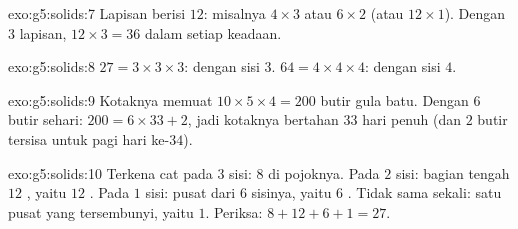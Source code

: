 \begin{solution}{exo:g5:solids:7}
Lapisan berisi $12$: misalnya $4 \times 3$ atau $6 \times 2$ (atau
$12 \times 1$). Dengan $3$ lapisan, 
$12 \times 3 = 36$  dalam setiap keadaan.
\end{solution}

\begin{solution}{exo:g5:solids:8}
$27 = 3 \times 3 \times 3$:  dengan sisi $3$.
$64 = 4 \times 4 \times 4$:  dengan sisi $4$.
\end{solution}

\begin{solution}{exo:g5:solids:9}
Kotaknya memuat $10 \times 5 \times 4 = 200$ butir gula batu. Dengan
$6$ butir sehari: $200 = 6 \times 33 + 2$, jadi kotaknya bertahan
$33$ hari penuh (dan $2$ butir tersisa untuk pagi hari ke-$34$).
\end{solution}

\begin{solution}{exo:g5:solids:10}
Terkena cat pada $3$ sisi: $8$  di pojoknya. Pada $2$ sisi:
bagian tengah $12$ , yaitu $12$ . Pada $1$ sisi: pusat
dari $6$ sisinya, yaitu $6$ . Tidak sama sekali: satu  pusat
yang tersembunyi, yaitu $1$. Periksa: $8 + 12 + 6 + 1 = 27$. \checkmark

\end{solution}
